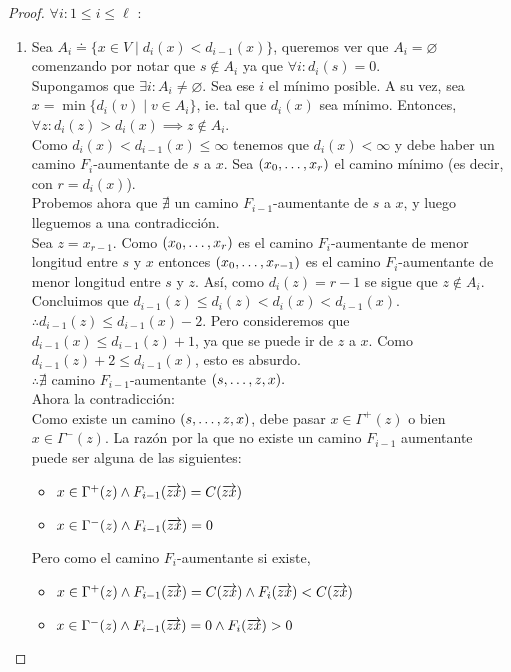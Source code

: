 \begin{proof}
  $\forall i : 1 \le i \le \ell$ :\\
  \begin{enumerate}
  \item
    Sea $A_i \doteq \{x \in V \mid d_i(x) < d_{i-1}(x)\}$, queremos ver que $A_i = \varnothing$ comenzando por notar que $s \notin A_i$ ya que $\forall i: d_i(s) = 0$.\\
    Supongamos que $\exists i : A_i \neq \varnothing$. Sea ese $i$ el mínimo posible. A su vez, sea $x = \min\{d_i(v) \mid v \in A_i \}$, ie. tal que $d_i(x)$ sea mínimo. Entonces, $\forall z : d_i(z) > d_i(x) \implies z\notin A_i$.\\
    Como $d_i(x) < d_{i-1}(x) \le \infty$ tenemos que $d_i(x) < \infty$ y debe haber un camino $F_i$-aumentante de $s$ a $x$. Sea $(x_0, \mathellipsis, x_r)$ el camino mínimo (es decir, con $r = d_i(x)$).\\
    Probemos ahora que $\nexists$ un camino $F_{i-1}$-aumentante de $s$ a $x$, y luego lleguemos a una contradicción.\\
    Sea $z = x_{r-1}$. Como $(x_0,\mathellipsis, x_r)$ es el camino $F_i$-aumentante de menor longitud entre $s$ y $x$ entonces $(x_0, \mathellipsis, x_{r-1})$ es el camino $F_{i}$-aumentante de menor longitud entre $s$ y $z$. Así, como $d_i(z) = r-1$ se sigue que $z \notin A_i$. Concluimos que $d_{i-1}(z) \le d_i(z) < d_i(x) < d_{i-1}(x)$. \\
    $\therefore d_{i-1}(z) \le d_{i-1}(x)-2$.
    Pero consideremos que $d_{i-1}(x) \le d_{i-1}(z) + 1$, ya que se puede ir de $z$ a $x$.
    Como $d_{i-1}(z)+2 \le d_{i-1}(x)$, esto es absurdo.\\
    $\therefore \nexists$ camino $F_{i-1}$-aumentante $(s,\mathellipsis, z, x).$\\
    Ahora la contradicción:\\
    Como existe un camino $(s, \mathellipsis, z, x)$, debe pasar $x \in \Gamma^+(z)$ o bien $x \in \Gamma^-(z)$. La razón por la que no existe un camino $F_{i-1}$ aumentante puede ser alguna de las siguientes:
    \begin{itemize}
    \item $x \in \Gamma^+(z) \wedge F_{i-1}(\overrightarrow{zx}) = C(\overrightarrow{zx})$
    \item $x \in \Gamma^-(z) \wedge F_{i-1}(\overrightarrow{zx}) = 0$ 
    \end{itemize}
    Pero como el camino $F_i$-aumentante si existe,
    \begin{itemize}
    \item $x \in \Gamma^+(z) \wedge F_{i-1}(\overrightarrow{zx}) = C(\overrightarrow{zx}) \wedge F_i(\overrightarrow{zx}) < C(\overrightarrow{zx})$
    \item $x \in \Gamma^-(z) \wedge F_{i-1}(\overrightarrow{zx}) = 0 \wedge F_i(\overrightarrow{zx}) > 0$
    \end{itemize}
    

\end{enumerate}
\end{proof}
